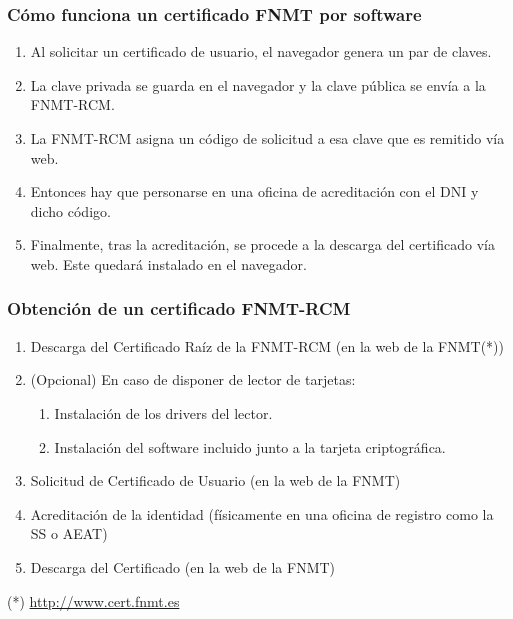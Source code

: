 \documentclass{beamer}
\begin{document}
\begin{frame}
\frametitle{Cómo funciona un certificado FNMT por software}

\begin{enumerate}
\item Al solicitar un certificado de usuario, el navegador genera un par de claves. 
\item La clave privada se guarda en el navegador y la clave pública se envía a la FNMT-RCM. 
\item La FNMT-RCM asigna un código de solicitud a esa clave que es remitido vía web. 
\item Entonces hay que personarse en una oficina de acreditación con el DNI y dicho código.  
\item Finalmente, tras la acreditación, se procede a la descarga del certificado vía web. Este quedará instalado en el navegador.
\end{enumerate}

\end{frame}




\begin{frame}
\frametitle{Obtención de un certificado FNMT-RCM}

\begin{enumerate}
\item Descarga del Certificado Raíz de la FNMT-RCM (en la web de la FNMT(*))

\item (Opcional) En caso de disponer de lector de tarjetas:
	\begin{enumerate}
	\item Instalación de los drivers del lector.
	\item Instalación del software incluido junto a la tarjeta criptográfica. 
	\end{enumerate}
\item Solicitud de Certificado de Usuario (en la web de la FNMT)
\item Acreditación de la identidad (físicamente en una oficina de registro como la SS o AEAT)
\item Descarga del Certificado (en la web de la FNMT)

\end{enumerate}

\begin{center}
 (*) \url{http://www.cert.fnmt.es}
\end{center}

\end{frame}
\end{document}

